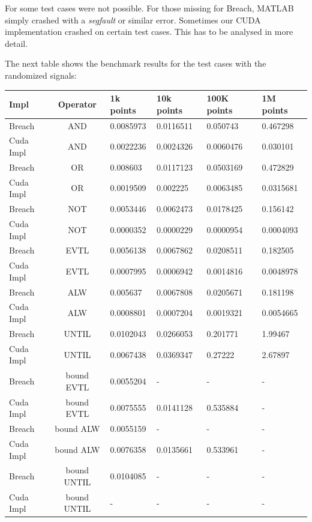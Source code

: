 \documentclass[a4paper,10pt]{article}
\begin{document}
For some test cases were not possible. For those missing for Breach, MATLAB simply crashed with a
{\it segfault} or similar error. Sometimes our CUDA implementation crashed on certain test cases. 
This has to be analysed in more detail.

The next table shows the benchmark results for the test cases with the randomized signals:

\begin{center}
	\begin{tabular}{| l | c || l | l | l | l |}
	    \hline
	    Impl & Operator & 1k points & 10k points & 100K points & 1M points \\
	    \hline \hline
	    Breach & AND & 0.0085973 & 0.0116511 & 0.050743 & 0.467298 \\
	    Cuda Impl & AND & 0.0022236 & 0.0024326 & 0.0060476 & 0.030101  \\
	    \hline \hline
	    Breach & OR & 0.008603 & 0.0117123 & 0.0503169 & 0.472829  \\
	    Cuda Impl & OR & 0.0019509 & 0.002225 & 0.0063485 & 0.0315681 \\
	    \hline \hline   
	    Breach & NOT & 0.0053446 & 0.0062473 & 0.0178425 & 0.156142 \\
	    Cuda Impl & NOT & 0.0000352 & 0.0000229 & 0.0000954 & 0.0004093 \\
	    \hline \hline   
        Breach & EVTL & 0.0056138 & 0.0067862 & 0.0208511 & 0.182505  \\
        Cuda Impl & EVTL & 0.0007995 & 0.0006942 & 0.0014816 & 0.0048978  \\
	    \hline \hline   
        Breach & ALW  & 0.005637 & 0.0067808 & 0.0205671 & 0.181198 \\
        Cuda Impl & ALW & 0.0008801 & 0.0007204 & 0.0019321 & 0.0054665  \\
	    \hline \hline   
        Breach & UNTIL & 0.0102043 & 0.0266053 & 0.201771 & 1.99467  \\
        Cuda Impl & UNTIL & 0.0067438 & 0.0369347 & 0.27222 & 2.67897  \\        
	    \hline \hline   
        Breach & bound EVTL & 0.0055204 & - & - & -  \\
        Cuda Impl & bound EVTL  & 0.0075555 & 0.0141128 & 0.535884 & - \\        
	    \hline \hline   
        Breach & bound ALW  & 0.0055159 & - & - & - \\
        Cuda Impl & bound ALW  & 0.0076358 & 0.0135661 & 0.533961 & - \\        
	    \hline \hline   
        Breach & bound UNTIL & 0.0104085 & - & - & - \\
        Cuda Impl & bound UNTIL & - & - & - & - \\        
	    \hline
	\end{tabular}
	\label{tab: bechmark results signal type2}
\end{center}
\end{document}
